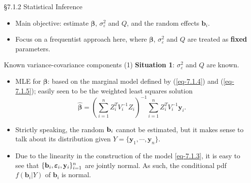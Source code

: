 \documentclass{beamer}
\newcommand{\boldbeta}{{\boldsymbol \beta}}
\newcommand{\boldvarepsilon}{{\boldsymbol \varepsilon}}
\newenvironment{wideitemize}%
  {\begin{itemize}%
    \setlength{\parskip}{1em}}%
  {\end{itemize}}
\begin{document}
\begin{frame}{\S7.1.2  Statistical Inference }
\begin{wideitemize}
\item
Main objective: estimate $\boldbeta$, $\sigma^2_\varepsilon$ and $Q$, and the random
effects $\mathbf{b}_i$.
\item
Focus on a frequentist approach here, where $\boldbeta$, $\sigma^2_\varepsilon$
and $Q$ are treated as \textbf{fixed} parameters.



\end{wideitemize}
\end{frame}

\begin{frame}{Known variance-covariance components (1)}
\noindent \textbf{Situation 1}: $\sigma^2_\varepsilon$ and $Q$ are known. 
\begin{wideitemize}
\item
MLE for $\boldsymbol \beta$:
%
based
on the marginal model defined by (\ref{eq-7.1.4}) and (\ref{eq-7.1.5}); easily seen to be  the weighted least squares solution
\begin{equation}
\hat{\boldbeta}=\left(\sum_{i=1}^n Z_i^TV_i^{-1}Z_i\right)^{-1}
\sum_{i=1}^n Z_i^TV_i^{-1}\mathbf{y}_i.
\label{eq-7.1.9}
\end{equation}
\item

Strictly speaking, the random ${\bf b}_i$ cannot be estimated, but it makes sense to talk about its distribution  given $Y=\{\mathbf{y}_1,\cdots, \mathbf{y}_n\}$. 

\item Due to the linearity in the construction of the model \eqref{eq-7.1.3}, it is easy to see that $\{{\bf b}_i, \boldvarepsilon_i, {\bf y}_i\}_{i=1}^n$ are jointly normal. As such,  the conditional pdf $f(\mathbf{b}_i|Y)$ of $\mathbf{b}_i$ is  normal.




\end{wideitemize}
\end{frame}
\end{document}
